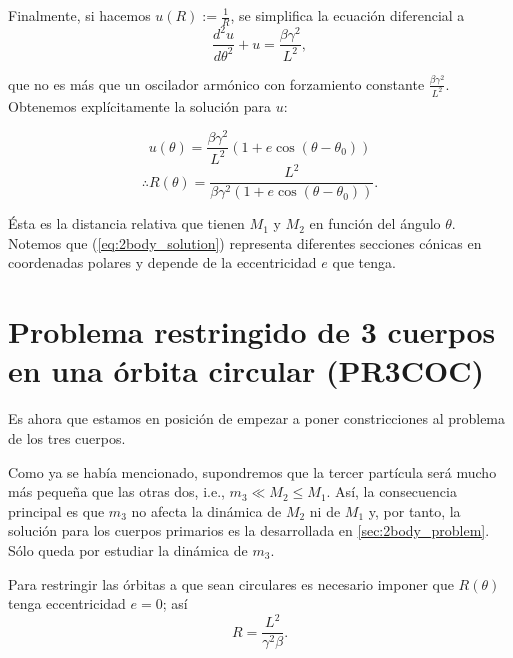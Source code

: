 Finalmente, si hacemos $u(R) := \frac{1}{R}$, se simplifica la ecuación diferencial a
\begin{equation}
 \frac{d^2u}{d\theta^2} + u = \frac{\beta \gamma^2}{L^2},
\end{equation}

que no es más que un oscilador armónico con forzamiento constante $\frac{\beta \gamma^2}{L^2}$. Obtenemos explícitamente la solución para $u$:

\begin{equation*}
 u(\theta) = \frac{\beta \gamma^2}{L^2} \left( 1 + e \cos (\theta - \theta_0 ) \right) 
\end{equation*}
\begin{equation}
 \therefore R(\theta) = \frac{L^2}{\beta \gamma^2 \left(1 + e \cos (\theta - \theta_0) \right)}.
 \label{eq:2body_solution}
\end{equation}


Ésta es la distancia relativa que tienen $M_1$ y $M_2$ en función del ángulo $\theta$. Notemos que (\ref{eq:2body_solution}) representa diferentes secciones cónicas en coordenadas polares y depende de la eccentricidad $e$ que tenga. 

\section{Problema restringido de 3 cuerpos en una órbita circular (PR3COC)}
\label{sec:R3BP}

Es ahora que estamos en posición de empezar a poner constricciones al problema de los tres cuerpos. 

Como ya se había mencionado, supondremos que la tercer partícula será mucho más pequeña que las otras dos, i.e., $m_3 \ll M_2 \leq M_1$. Así, la consecuencia principal es que $m_3$ no afecta la dinámica de $M_2$ ni de $M_1$ y, por tanto, la solución para los cuerpos primarios es la desarrollada en \ref{sec:2body_problem}. Sólo queda por estudiar la dinámica de $m_3$.

Para restringir las órbitas a que sean circulares es necesario imponer que $R(\theta)$ tenga eccentricidad $e=0$; así
\begin{equation}
 R = \frac{L^2}{\gamma^2 \beta}.
 \label{eq:3body_restricted_solution}
\end{equation} 

